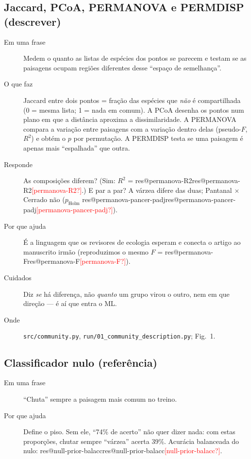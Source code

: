 \documentclass[11pt,a4paper]{article}
\makeatletter
\newcommand{\res}[1]{\ifcsname res@#1\endcsname\csname res@#1\endcsname\else\textcolor{red}{[#1?]}\fi}
\makeatother
\begin{document}
\subsection{Jaccard, PCoA, PERMANOVA e PERMDISP (descrever)}
\begin{description}
\item[Em uma frase] Medem o quanto as listas de espécies dos pontos se parecem e testam se as
paisagens ocupam regiões diferentes desse ``espaço de semelhança''.
\item[O que faz] Jaccard entre dois pontos = fração das espécies que \emph{não} é compartilhada
(0 = mesma lista; 1 = nada em comum). A PCoA desenha os pontos num plano em que a distância
aproxima a dissimilaridade. A PERMANOVA compara a variação entre paisagens com a variação dentro
delas (pseudo-$F$, $R^2$) e obtém o $p$ por permutação. A PERMDISP testa se uma paisagem é
apenas mais ``espalhada'' que outra.
\item[Responde] As composições diferem? (Sim: $R^2$ = \res{permanova-R2}.) E par a par? A várzea
difere das duas; Pantanal $\times$ Cerrado não ($p_{\mathrm{Holm}}$ \res{permanova-pancer-padj}).
\item[Por que ajuda] É a linguagem que os revisores de ecologia esperam e conecta o artigo ao
manuscrito irmão (reproduzimos o mesmo $F$ = \res{permanova-F}).
\item[Cuidados] Diz \emph{se} há diferença, não \emph{quanto} um grupo virou o outro, nem em que
direção --- é aí que entra o ML.
\item[Onde] \texttt{src/community.py}, \texttt{run/01\_community\_description.py}; Fig.~1.
\end{description}

\subsection{Classificador nulo (referência)}
\begin{description}
\item[Em uma frase] ``Chuta'' sempre a paisagem mais comum no treino.
\item[Por que ajuda] Define o piso. Sem ele, ``74\% de acerto'' não quer dizer nada: com estas
proporções, chutar sempre ``várzea'' acerta 39\%. Acurácia balanceada do nulo:
\res{null-prior-balacc}.
\end{description}
\end{document}
